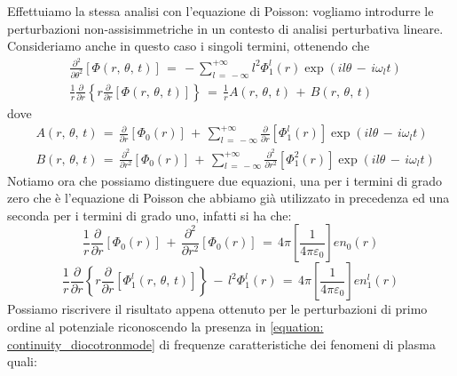 Effettuiamo la stessa analisi con l'equazione di Poisson: vogliamo introdurre le perturbazioni non-assisimmetriche in un contesto di 
analisi perturbativa lineare. Consideriamo anche in questo caso i singoli termini, ottenendo che 
\begin{align}
    & \frac{\partial^2}{\partial \theta^2}\left[\Phi\left(r,\,\theta,\,t\right)\right]\,=\,-\sum_{l\,=\,-\infty}^{+\infty} l^2 \Phi_1^l\left(r\right)\exp{\left(il\theta\,-\,i\omega_l t\right)}\\
    & \frac{1}{r}\frac{\partial}{\partial r}\left\{r\frac{\partial}{\partial r}\left[\Phi\left(r,\,\theta,\,t\right)\right]\right\}\,=\,\frac{1}{r}A\left(r,\,\theta,\,t\right)\,+\,B\left(r,\,\theta,\,t\right)
\end{align}
dove
\begin{align}
    & A\left(r,\,\theta,\,t\right)\,=\,\frac{\partial}{\partial r}\left[\Phi_0\left(r\right)\right]\,+\,\sum_{l\,=\,-\infty}^{+\infty}\frac{\partial}{\partial r}\left[\Phi_1^l\left(r\right)\right]\exp{\left(il\theta\,-\,i\omega_l t\right)} \\
    & B\left(r,\,\theta,\,t\right)\,=\,\frac{\partial^2}{\partial r^2}\left[\Phi_0\left(r\right)\right]\,+\,\sum_{l\,=\,-\infty}^{+\infty}\frac{\partial ^2}{\partial r^2}\left[\Phi_1^2\left(r\right)\right]\exp{\left(il\theta\,-\,i\omega_l t\right)}
\end{align}
Notiamo ora che possiamo distinguere due equazioni, una per i termini di grado zero che è l'equazione di Poisson che abbiamo già
utilizzato in precedenza ed una seconda per i termini di grado uno, infatti si ha che:
\begin{equation}
    \frac{1}{r}\frac{\partial}{\partial r}\left[\Phi_0\left(r\right)\right]\,+\,\frac{\partial^2}{\partial r^2}\left[\Phi_0\left(r\right)\right]\,=\,4\pi \left[\frac{1}{4\pi\varepsilon_0}\right] en_0\left(r\right)
    \label{equation: Poisson_termini0}
\end{equation}
\begin{equation}
    \frac{1}{r}\frac{\partial}{\partial r}\left\{r\frac{\partial}{\partial r}\left[\Phi_1^l\left(r,\,\theta,\,t\right)\right]\right\}\,-\,l^2\Phi_1^l\left(r\right)\,=\,4\pi \left[\frac{1}{4\pi\varepsilon_0}\right] en_1^l\left(r\right)
    \label{equation: Poisson_termini1}
\end{equation}
Possiamo riscrivere il risultato appena ottenuto per le perturbazioni di primo ordine al potenziale riconoscendo la presenza in \eqref{equation: continuity_diocotronmode} 
di frequenze caratteristiche dei fenomeni di plasma quali:
